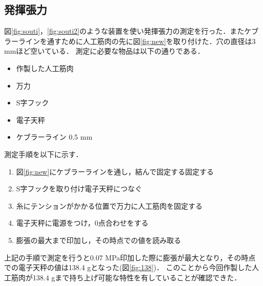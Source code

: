 \subsection{発揮張力}
図\ref{fig:souti}，\ref{fig:souti2}のような装置を使い発揮張力の測定を行った．またケブラーラインを通すために人工筋肉の先に図\ref{fig:new}を取り付けた．穴の直径は3 mmほど空いている．
測定に必要な物品は以下の通りである．
\begin{itemize}
  \item 作製した人工筋肉
  \item 万力
  \item S字フック
  \item 電子天秤 
  \item ケブラーライン 0.5 mm
\end{itemize}
測定手順を以下に示す．
\begin{enumerate}
  \item 図\ref{fig:new}にケブラーラインを通し，結んで固定する固定する
  \item S字フックを取り付け電子天秤につなぐ
  \item 糸にテンションがかかる位置で万力に人工筋肉を固定する
  \item 電子天秤に電源をつけ，0点合わせをする
  \item 膨張の最大まで印加し，その時点での値を読み取る
\end{enumerate}
上記の手順で測定を行うと0.07 MPa印加した際に膨張が最大となり，その時点での電子天秤の値は138.4 gとなった(図\ref{fig:138})．
このことから今回作製した人工筋肉が138.4 gまで持ち上げ可能な特性を有していることが確認できた．

